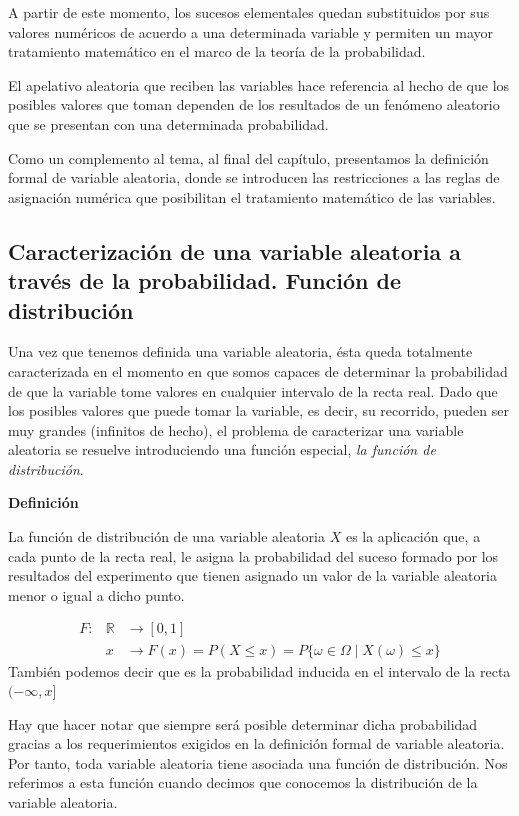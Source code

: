 \documentclass[
]{article}
\begin{document}
A partir de este momento, los sucesos elementales quedan substituidos
por sus valores numéricos de acuerdo a una determinada variable y
permiten un mayor tratamiento matemático en el marco de la teoría de la
probabilidad.

El apelativo aleatoria que reciben las variables hace referencia al
hecho de que los posibles valores que toman dependen de los resultados
de un fenómeno aleatorio que se presentan con una determinada
probabilidad.

Como un complemento al tema, al final del capítulo, presentamos la
definición formal de variable aleatoria, donde se introducen las
restricciones a las reglas de asignación numérica que posibilitan el
tratamiento matemático de las variables.

\subsection{Caracterización de una variable aleatoria a través de la probabilidad. Función de distribución}\label{caracterizaciuxf3n-de-una-variable-aleatoria-a-travuxe9s-de-la-probabilidad.-funciuxf3n-de-distribuciuxf3n}

Una vez que tenemos definida una variable aleatoria, ésta queda
totalmente caracterizada en el momento en que somos capaces de
determinar la probabilidad de que la variable tome valores en cualquier
intervalo de la recta real. Dado que los posibles valores que puede
tomar la variable, es decir, su recorrido, pueden ser muy grandes
(infinitos de hecho), el problema de caracterizar una variable aleatoria
se resuelve introduciendo una función especial, \emph{la función de
distribución}.

\textbf{Definición}

La función de distribución de una variable aleatoria \(X\) es la
aplicación que, a cada punto de la recta real, le asigna la probabilidad
del suceso formado por los resultados del experimento que tienen
asignado un valor de la variable aleatoria menor o igual a dicho punto.

\[
\begin{array}{rll}
F: & \mathbb{R} & \rightarrow[0,1] \\
& x & \rightarrow F(x)=P(X \leq x)=P\{\omega \in \Omega \mid X(\omega) \leq x\}
\end{array}
\] También podemos decir que es la probabilidad inducida en el intervalo
de la recta \((-\infty, x]\)

Hay que hacer notar que siempre será posible determinar dicha
probabilidad gracias a los requerimientos exigidos en la definición
formal de variable aleatoria. Por tanto, toda variable aleatoria tiene
asociada una función de distribución. Nos referimos a esta función
cuando decimos que conocemos la distribución de la variable aleatoria.
\end{document}
